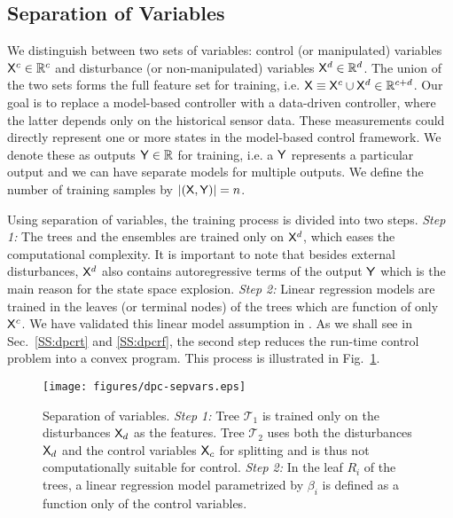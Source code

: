 \subsection{Separation of Variables}
\label{SS:sepvar}
We distinguish between two sets of variables: control (or manipulated) variables $\mathsf{X}^c \in \mathbb{R}^c$ and disturbance (or non-manipulated) variables $\mathsf{X}^d \in \mathbb{R}^d$. The union of the two sets forms the full feature set for training, i.e. $\mathsf{X} \equiv \mathsf{X}^c \cup \mathsf{X}^d \in \mathbb{R}^{c+d}$.
Our goal is to replace a model-based controller with a data-driven controller, where the latter depends only on the historical sensor data. 
These measurements could directly represent one or more states in the model-based control framework. We denote these as outputs $\mathsf{Y} \in \mathbb{R}$ for training, i.e. a $\mathsf{Y}$ represents a particular output and we can have separate models for multiple outputs. We define the number of training samples by $|(\mathsf{X},\mathsf{Y})| = n$.

Using separation of variables, the training process is divided into two steps. \textit{Step 1:} The trees and the ensembles are trained only on $\mathsf{X}^d$, which eases the computational complexity. It is important to note that besides external disturbances, $\mathsf{X}^d$ also contains autoregressive terms of the output $\mathsf{Y}$ which is the main reason for the state space explosion. \textit{Step 2:} Linear regression models are trained in the leaves (or terminal nodes) of the trees which are function of only $\mathsf{X}^c$. We have validated this linear model assumption in \cite{Jain2016}. As we shall see in Sec.~\ref{SS:dpcrt} and \ref{SS:dpcrf}, the second step reduces the run-time control problem into a convex program. This process is illustrated in Fig.~\ref{F:dpc-sepvars}.
\begin{figure}[t!]
	\centering
	\texttt{[image: figures/dpc-sepvars.eps]}
	\caption{Separation of variables. \textit{Step 1:} Tree $\mathcal{T}_1$ is trained only on the disturbances $\mathsf{X}_d$ as the features. Tree $\mathcal{T}_2$ uses both the disturbances $\mathsf{X}_d$ and the control variables $\mathsf{X}_c$ for splitting and is thus not computationally suitable for control. \textit{Step 2:} In the leaf $R_i$ of the trees, a linear regression model parametrized by $\beta_i$ is defined as a function only of the control variables.}
	\captionsetup{justification=centering}
	\label{F:dpc-sepvars}
\end{figure}

